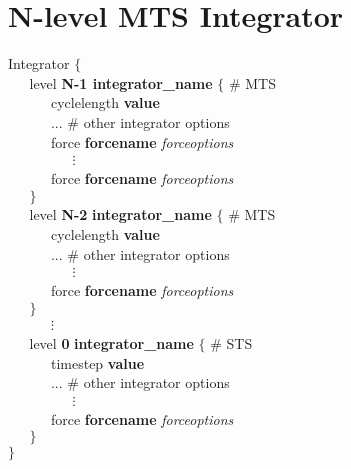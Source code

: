 \documentclass{article}
\begin{document}
\section{N-level MTS Integrator}
Integrator $\{$\\
\verb|   |level \textbf{N-1 integrator\_name} $\{$ \# MTS \\
\verb|   |\verb|   |cyclelength \textbf{value}\\
\verb|   |\verb|   |...  \# other integrator options\\
\verb|   |\verb|   |force \textbf{forcename} \emph{forceoptions}\\
\verb|   |\verb|   |\verb|   |$\vdots$\\
\verb|   |\verb|   |force \textbf{forcename} \emph{forceoptions}\\
\verb|   |$\}$   \\
\verb|   |level \textbf{N-2} \textbf{integrator\_name} $\{$ \# MTS \\
\verb|   |\verb|   |cyclelength \textbf{value}\\
\verb|   |\verb|   |...  \# other integrator options\\
\verb|   |\verb|   |\verb|   |$\vdots$\\
\verb|   |\verb|   |force \textbf{forcename} \emph{forceoptions}\\
\verb|   |$\}$  \\ 
\verb|   |\verb|   |$\vdots$\\
\verb|   |level \textbf{0} \textbf{integrator\_name} $\{$ \# STS \\
\verb|   |\verb|   |timestep \textbf{value}\\
\verb|   |\verb|   |...  \# other integrator options\\
\verb|   |\verb|   |\verb|   |$\vdots$\\
\verb|   |\verb|   |force \textbf{forcename} \emph{forceoptions}\\
\verb|   |$\}$ \\
$\}$
\end{document}
